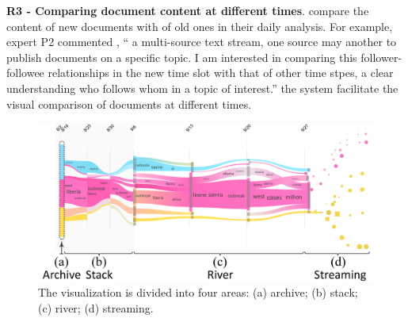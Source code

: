 
\noindent \textbf{\normalsize R3 - Comparing document content at different times}.
 compare the content of new documents with  of old ones in their daily analysis.
For example, expert P2 commented , `` a multi-source text stream, one source may  another to publish documents on a specific topic.
I am interested in comparing this follower-followee relationships in the new time slot with that of other time stpes,  a clear understanding  who follows whom in a topic of interest.''
 the system  facilitate the visual comparison of documents at different times.

\begin{figure}[b]
	\centering
\vspace{-4mm}
	\includegraphics[width=\columnwidth]{fig/fourAreas}
	\vspace{-4mm}
	\caption{The visualization is divided into four areas: (a) archive; (b) stack; (c) river; (d) streaming.}
	\label{fig:fourAreas}
\end{figure}


